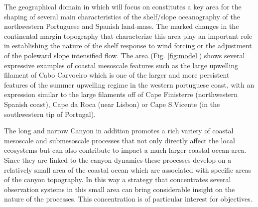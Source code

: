 The geographical domain in which \proj will focus on constitutes a key
area for the shaping of several main characteristics of the
shelf/slope oceanography of the northwestern Portuguese and Spanish
land-mass. The marked changes in the continental margin topography
that characterize this area play an important role in establishing the
nature of the shelf response to wind forcing or the adjustment of the
poleward slope intensified flow. The area (Fig. \ref{fig:model}) shows
several expressive examples of coastal mesoscale features such as the
large upwelling filament of Cabo Carvoeiro which is one of the larger
and more persistent features of the summer upwelling regime in the
western portuguese coast, with an expression similar to the large
filaments off of Cape Finisterre (northwestern Spanish coast), Cape da
Roca (near Lisbon) or Cape S.Vicente (in the southwestern tip of
Portugal).

The long and narrow \naz Canyon in addition promotes a rich variety of
coastal mesoscale and submesoscale processes that not only directly
affect the local ecosystems but can also contribute to impact a much
larger coastal ocean area. Since they are linked to the canyon
dynamics these processes develop on a relatively small area of the
coastal ocean which are associated with specific areas of the canyon
topography. In this way a strategy that concentrates several
observation systems in this small area can bring considerable insight
on the nature of the processes. This concentration is of particular
interest for \proj objectives. 
 
 